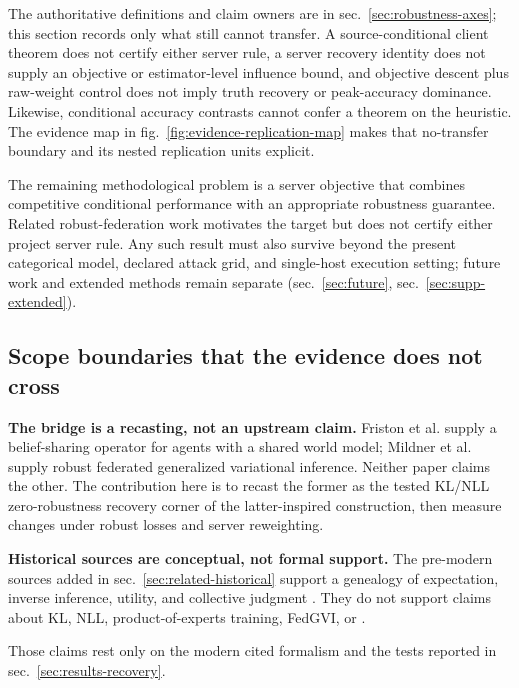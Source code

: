 \documentclass[
  english,
]{article}
\theoremstyle{plain}
\theoremstyle{definition}
\theoremstyle{remark}
\theoremstyle{definition}
\begin{document}
The authoritative definitions and claim owners are in
sec.~\ref{sec:robustness-axes}; this section records only what still
cannot transfer. A source-conditional client theorem does not certify
either server rule, a server recovery identity does not supply an
objective or estimator-level influence bound, and objective descent plus
raw-weight control does not imply truth recovery or peak-accuracy
dominance. Likewise, conditional accuracy contrasts cannot confer a
theorem on the heuristic. The evidence map in
fig.~\ref{fig:evidence-replication-map} makes that no-transfer boundary
and its nested replication units explicit.

The remaining methodological problem is a server objective that combines
competitive conditional performance with an appropriate robustness
guarantee. Related robust-federation work motivates the target
\citep{blanchard2017krum, li2022gammafl} but does not certify either
project server rule. Any such result must also survive beyond the
present categorical model, declared attack grid, and single-host
execution setting; future work and extended methods remain separate
(sec.~\ref{sec:future}, sec.~\ref{sec:supp-extended}).

\subsection{Scope boundaries that the evidence does not
cross}\label{sec:limitations-scope}

\textbf{The bridge is a recasting, not an upstream claim.} Friston et
al. \citep{friston2024federated} supply a belief-sharing operator for
agents with a shared world model; Mildner et al.
\citep{mildner2025fedgvi} supply robust federated generalized
variational inference. Neither paper claims the other. The contribution
here is to recast the former as the tested KL/NLL zero-robustness
recovery corner of the latter-inspired construction, then measure
changes under robust losses and server reweighting.

\textbf{Historical sources are conceptual, not formal support.} The
pre-modern sources added in sec.~\ref{sec:related-historical} support a
genealogy of expectation, inverse inference, utility, and collective
judgment
\citep{huygens1657ratiociniis, bayes1763essay, laplace1774memoire, bernoulli1738mensura, condorcet1785essai}.
They do not support claims about KL, NLL, product-of-experts training,
FedGVI, or .

Those claims rest only on the modern cited formalism and the tests
reported in sec.~\ref{sec:results-recovery}.
\end{document}
